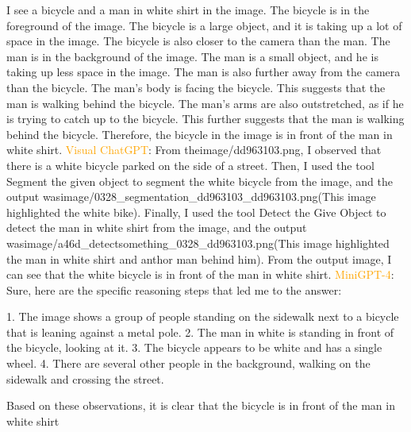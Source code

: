\begin{enumerate}
    I see a bicycle and a man in white shirt in the image.
    The bicycle is in the foreground of the image. The bicycle is a large object, and it is taking up a lot of space in the image. The bicycle is also closer to the camera than the man.
    The man is in the background of the image. The man is a small object, and he is taking up less space in the image. The man is also further away from the camera than the bicycle.
    The man's body is facing the bicycle. This suggests that the man is walking behind the bicycle.
    The man's arms are also outstretched, as if he is trying to catch up to the bicycle. This further suggests that the man is walking behind the bicycle.
    Therefore, the bicycle in the image is in front of the man in white shirt.
    \subitem \textcolor{orange}{Visual ChatGPT}: From theimage/dd963103.png, I observed that there is a white bicycle parked on the side of a street. Then, I used the tool Segment the given object to segment the white bicycle from the image, and the output wasimage/0328\_segmentation\_dd963103\_dd963103.png(This image highlighted the white bike). Finally, I used the tool Detect the Give Object to detect the man in white shirt from the image, and the output wasimage/a46d\_detect\-something\_0328\_dd963103.png(This image highlighted the man in white shirt and anthor man behind him). From the output image, I can see that the white bicycle is in front of the man in white shirt.
    \subitem \textcolor{orange}{MiniGPT-4}: Sure, here are the specific reasoning steps that led me to the answer:

    1. The image shows a group of people standing on the sidewalk next to a bicycle that is leaning against a metal pole.
    2. The man in white is standing in front of the bicycle, looking at it.
    3. The bicycle appears to be white and has a single wheel.
    4. There are several other people in the background, walking on the sidewalk and crossing the street.
    
    Based on these observations, it is clear that the bicycle is in front of the man in white shirt
\end{enumerate}
